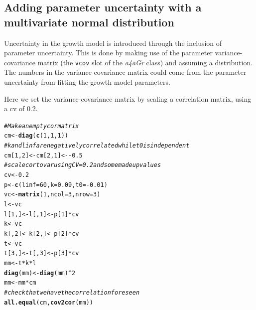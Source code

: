 \documentclass[a4paper,english,10pt]{article}\usepackage[]{graphicx}\usepackage[]{color}
\makeatletter
\newcommand{\hlnum}[1]{\textcolor[rgb]{0.686,0.059,0.569}{#1}}%
\newcommand{\hlcom}[1]{\textcolor[rgb]{0.678,0.584,0.686}{\textit{#1}}}%
\newcommand{\hlopt}[1]{\textcolor[rgb]{0,0,0}{#1}}%
\newcommand{\hlstd}[1]{\textcolor[rgb]{0.345,0.345,0.345}{#1}}%
\newcommand{\hlkwb}[1]{\textcolor[rgb]{0.69,0.353,0.396}{#1}}%
\newcommand{\hlkwc}[1]{\textcolor[rgb]{0.333,0.667,0.333}{#1}}%
\newcommand{\hlkwd}[1]{\textcolor[rgb]{0.737,0.353,0.396}{\textbf{#1}}}%
\newenvironment{kframe}{%
 \def\at@end@of@kframe{}%
 \ifinner\ifhmode%
  \def\at@end@of@kframe{\end{minipage}}%
  \begin{minipage}{\columnwidth}%
 \fi\fi%
 \def\FrameCommand##1{\hskip\@totalleftmargin \hskip-\fboxsep
 \colorbox{shadecolor}{##1}\hskip-\fboxsep
     \hskip-\linewidth \hskip-\@totalleftmargin \hskip\columnwidth}%
 \MakeFramed {\advance\hsize-\width
   \@totalleftmargin\z@ \linewidth\hsize
   \@setminipage}}%
 {\par\unskip\endMakeFramed%
 \at@end@of@kframe}
\newenvironment{knitrout}{}{} %
\newcommand{\code}[1]{{\texttt{#1}}}
\newcommand{\class}[1]{{\textit{#1}}}
\makeatother
\begin{document}
\subsection{Adding parameter uncertainty with a multivariate normal distribution}

Uncertainty in the growth model is introduced through the inclusion of parameter uncertainty.
This is done by making use of the parameter variance-covariance matrix (the \code{vcov} slot of the \class{a4aGr} class) and assuming a distribution.
The numbers in the variance-covariance matrix could come from the parameter uncertainty from fitting the growth model parameters.

Here we set the variance-covariance matrix by scaling a correlation matrix, using a cv of 0.2.

\begin{knitrout}
\color{fgcolor}\begin{kframe}
\begin{alltt}
\hlcom{# Make an empty cor matrix}
\hlstd{cm} \hlkwb{<-} \hlkwd{diag}\hlstd{(}\hlkwd{c}\hlstd{(}\hlnum{1}\hlstd{,} \hlnum{1}\hlstd{,} \hlnum{1}\hlstd{))}
\hlcom{# k and linf are negatively correlated while t0 is independent}
\hlstd{cm[}\hlnum{1}\hlstd{,} \hlnum{2}\hlstd{]} \hlkwb{<-} \hlstd{cm[}\hlnum{2}\hlstd{,} \hlnum{1}\hlstd{]} \hlkwb{<-} \hlopt{-}\hlnum{0.5}
\hlcom{# scale cor to var using CV=0.2 and some made up values}
\hlstd{cv} \hlkwb{<-} \hlnum{0.2}
\hlstd{p} \hlkwb{<-} \hlkwd{c}\hlstd{(}\hlkwc{linf} \hlstd{=} \hlnum{60}\hlstd{,} \hlkwc{k} \hlstd{=} \hlnum{0.09}\hlstd{,} \hlkwc{t0} \hlstd{=} \hlopt{-}\hlnum{0.01}\hlstd{)}
\hlstd{vc} \hlkwb{<-} \hlkwd{matrix}\hlstd{(}\hlnum{1}\hlstd{,} \hlkwc{ncol} \hlstd{=} \hlnum{3}\hlstd{,} \hlkwc{nrow} \hlstd{=} \hlnum{3}\hlstd{)}
\hlstd{l} \hlkwb{<-} \hlstd{vc}
\hlstd{l[}\hlnum{1}\hlstd{, ]} \hlkwb{<-} \hlstd{l[,} \hlnum{1}\hlstd{]} \hlkwb{<-} \hlstd{p[}\hlnum{1}\hlstd{]} \hlopt{*} \hlstd{cv}
\hlstd{k} \hlkwb{<-} \hlstd{vc}
\hlstd{k[,} \hlnum{2}\hlstd{]} \hlkwb{<-} \hlstd{k[}\hlnum{2}\hlstd{, ]} \hlkwb{<-} \hlstd{p[}\hlnum{2}\hlstd{]} \hlopt{*} \hlstd{cv}
\hlstd{t} \hlkwb{<-} \hlstd{vc}
\hlstd{t[}\hlnum{3}\hlstd{, ]} \hlkwb{<-} \hlstd{t[,} \hlnum{3}\hlstd{]} \hlkwb{<-} \hlstd{p[}\hlnum{3}\hlstd{]} \hlopt{*} \hlstd{cv}
\hlstd{mm} \hlkwb{<-} \hlstd{t} \hlopt{*} \hlstd{k} \hlopt{*} \hlstd{l}
\hlkwd{diag}\hlstd{(mm)} \hlkwb{<-} \hlkwd{diag}\hlstd{(mm)}\hlopt{^}\hlnum{2}
\hlstd{mm} \hlkwb{<-} \hlstd{mm} \hlopt{*} \hlstd{cm}
\hlcom{# check that we have the correlation foreseen}
\hlkwd{all.equal}\hlstd{(cm,} \hlkwd{cov2cor}\hlstd{(mm))}

\end{alltt}
\end{kframe}
\end{knitrout}
\end{document}
